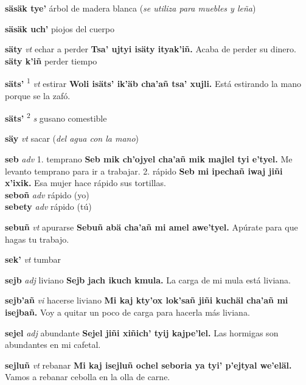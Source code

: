 \documentclass[10pt]{scrbook}
\newcommand{\entry}[1]{\textbf{#1}}
\newcommand{\onedefinition}[1]{#1.}
\newcommand{\defsuperscript}[1]{\textsuperscript{#1}}
\newcommand{\partofspeech}[1]{\textit{#1}}
\newcommand{\spanishtranslation}[1]{#1}
\newcommand{\clarification}[1]{(\textit{#1})}
\newcommand{\cholexample}[1]{\textbf{#1}}
\newcommand{\exampletranslation}[1]{#1}
\newcommand{\secondaryentry}[1]{\\\textbf{#1}}
\newcommand{\secondpartofspeech}[1]{\textit{#1}}
\newcommand{\secondtranslation}[1]{#1}
\begin{document}
\begin{multicols}{2}
\entry{säsäk tye'}
\spanishtranslation{árbol de madera blanca}
\clarification{se utiliza para muebles y leña}

\entry{säsäk uch'}
\spanishtranslation{piojos del cuerpo}

\entry{säty}
\partofspeech{vt}
\spanishtranslation{echar a perder}
\cholexample{Tsa' ujtyi isäty ityak'iñ.}
\exampletranslation{Acaba de perder su dinero.}
\secondaryentry{säty k'iñ}
\secondtranslation{perder tiempo}

\entry{säts'}
\defsuperscript{1}
\partofspeech{vt}
\spanishtranslation{estirar}
\cholexample{Woli isäts' ik'äb cha'añ tsa' xujli.}
\exampletranslation{Está estirando la mano porque se la zafó.}

\entry{säts'}
\defsuperscript{2}
\partofspeech{s}
\spanishtranslation{gusano comestible}

\entry{säy}
\partofspeech{vt}
\spanishtranslation{sacar}
\clarification{del agua con la mano}

\entry{seb}
\partofspeech{adv}
\onedefinition{1}
\spanishtranslation{temprano}
\cholexample{Seb mik ch'ojyel cha'añ mik majlel tyi e'tyel.}
\exampletranslation{Me levanto temprano para ir a trabajar.}
\onedefinition{2}
\spanishtranslation{rápido}
\cholexample{Seb mi ipechañ iwaj jiñi x'ixik.}
\exampletranslation{Esa mujer hace rápido sus tortillas.}
\secondaryentry{seboñ}
\secondpartofspeech{adv}
\secondtranslation{rápido (yo)}
\secondaryentry{sebety}
\secondpartofspeech{adv}
\secondtranslation{rápido (tú)}

\entry{sebuñ}
\partofspeech{vt}
\spanishtranslation{apurarse}
\cholexample{Sebuñ abä cha'añ mi amel awe'tyel.}
\exampletranslation{Apúrate para que hagas tu trabajo.}

\entry{sek'}
\partofspeech{vt}
\spanishtranslation{tumbar}

\entry{sejb}
\partofspeech{adj}
\spanishtranslation{liviano}
\cholexample{Sejb jach ikuch kmula.}
\exampletranslation{La carga de mi mula está liviana.}

\entry{sejb'añ}
\partofspeech{vi}
\spanishtranslation{hacerse liviano}
\cholexample{Mi kaj kty'ox lok'sañ jiñi kuchäl cha'añ mi isejbañ.}
\exampletranslation{Voy a quitar un poco de carga para hacerla más liviana.}

\entry{sejel}
\partofspeech{adj}
\spanishtranslation{abundante}
\cholexample{Sejel jiñi xiñich' tyij kajpe'lel.}
\exampletranslation{Las hormigas son abundantes en mi cafetal.}

\entry{sejluñ}
\partofspeech{vt}
\spanishtranslation{rebanar}
\cholexample{Mi kaj isejluñ ochel seboria ya tyi' p'ejtyal we'eläl.}
\exampletranslation{Vamos a rebanar cebolla en la olla de carne.}


\end{multicols}
\end{document}
